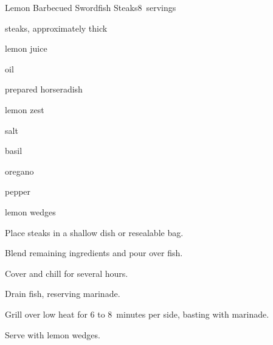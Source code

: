 \begin{recipe}{Lemon Barbecued Swordfish Steaks}{}{8~servings}

\begin{ingredients}
\item {}  steaks, approximately  thick
\item \C{\threequarter} lemon juice
\item \C{\threequarter} oil
\item {} prepared horseradish
\item {} lemon zest
\item \tp{1\half} salt
\item \tp{\half} basil
\item \tp{\half} oregano
\item \tp{\half} pepper
\item lemon wedges
\end{ingredients}

\begin{directions}
\item Place steaks in a shallow dish or resealable bag.
\item Blend remaining ingredients and pour over fish.
\item Cover and chill for several hours.
\item Drain fish, reserving marinade.
\item Grill over low heat for 6 to 8~minutes per side, basting with marinade.
\item Serve with lemon wedges.
\end{directions}

\end{recipe}
